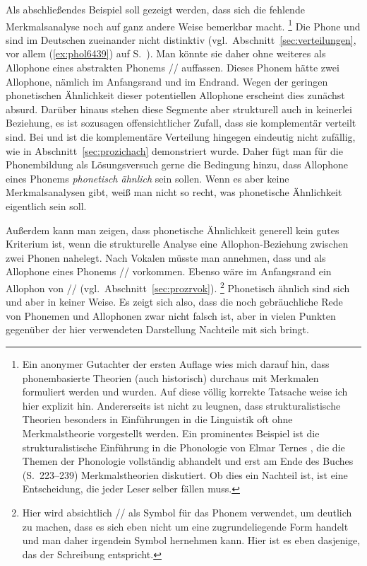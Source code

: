 Als abschließendes Beispiel soll gezeigt werden, dass sich die fehlende Merk\-mals\-ana\-lyse noch auf ganz andere Weise bemerkbar macht.%
\footnote{Ein anonymer Gutachter der ersten Auflage wies mich darauf hin, dass phonembasierte Theorien (auch historisch) durchaus mit Merkmalen formuliert werden und wurden.
Auf diese völlig korrekte Tatsache weise ich hier explizit hin.
Andererseits ist nicht zu leugnen, dass strukturalistische Theorien besonders in Einführungen in die Linguistik oft ohne Merkmalstheorie vorgestellt werden.
Ein prominentes Beispiel ist die strukturalistische Einführung in die Phonologie von Elmar Ternes \citep{Ternes2012}, die die Themen der Phonologie vollständig abhandelt und erst am Ende des Buches (S.\ 223--239) Merkmalstheorien diskutiert.
Ob dies ein Nachteil ist, ist eine Entscheidung, die jeder Leser selber fällen muss.}
Die Phone \textipa{[h]} und \textipa{[N]} sind im Deutschen zueinander nicht distinktiv (vgl.\ Abschnitt~\ref{sec:verteilungen}, vor allem (\ref{ex:phol6439}) auf S.~\pageref{ex:phol6439}).
Man könnte sie daher ohne weiteres als Allophone eines abstrakten Phonems // auffassen.
Dieses Phonem hätte zwei Allophone, nämlich \textipa{[h]} im Anfangsrand und \textipa{[N]} im Endrand.
Wegen der geringen phonetischen Ähnlichkeit dieser potentiellen Allophone erscheint dies zunächst absurd.
Darüber hinaus stehen diese Segmente aber strukturell auch in keinerlei Beziehung, es ist sozusagen offensichtlicher Zufall, dass sie komplementär verteilt sind.
Bei \textipa{[\c{c}]} und \textipa{[X]} ist die komplementäre Verteilung hingegen eindeutig nicht zufällig, wie in Abschnitt~\ref{sec:prozichach} demonstriert wurde.
Daher fügt man für die Phonembildung als Lösungsversuch gerne die Bedingung hinzu, dass Allophone eines Phonems \textit{phonetisch ähnlich} sein sollen.
Wenn es aber keine Merkmalsanalysen gibt, weiß man nicht so recht, was phonetische Ähnlichkeit eigentlich sein soll.

Außerdem kann man zeigen, dass phonetische Ähnlichkeit generell kein gutes Kriterium ist, wenn die strukturelle Analyse eine Allophon-Beziehung zwischen zwei Phonen nahelegt.
Nach Vokalen müsste man \zB annehmen, dass \textipa{[@]} und \textipa{[5]} als Allophone eines Phonems // vorkommen.
Ebenso wäre im Anfangsrand \textipa{[K]} ein Allophon von // (vgl.\ Abschnitt~\ref{sec:prozrvok}).%
\footnote{Hier wird absichtlich // als Symbol für das Phonem verwendet, um deutlich zu machen, dass es sich eben nicht um eine zugrundeliegende Form handelt und man daher irgendein Symbol hernehmen kann.
Hier ist es eben dasjenige, das der Schreibung entspricht.}
Phonetisch ähnlich sind sich \textipa{[@]} und \textipa{[K]} aber in keiner Weise.
Es zeigt sich also, dass die noch gebräuchliche Rede von Phonemen und Allophonen zwar nicht falsch ist, aber in vielen Punkten gegenüber der hier verwendeten Darstellung Nachteile mit sich bringt.


